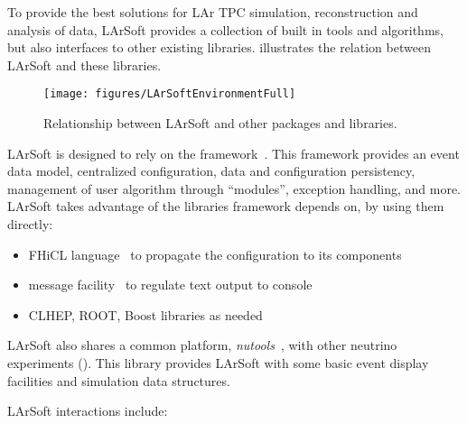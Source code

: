 
%
%
%

To provide the best solutions for LAr TPC simulation, reconstruction and
analysis of data, LArSoft provides a collection of built in tools and
algorithms, but also interfaces to other existing libraries.
 illustrates the relation between LArSoft and
these libraries.

\begin{figure}
	\texttt{[image: figures/LArSoftEnvironmentFull]}
	\caption{\label{fig:LArSoftRelations}
		Relationship between LArSoft and other packages and libraries.
	}
\end{figure}

LArSoft is designed to rely on the \ART framework~\cite{ART}.
This framework provides an event data model, centralized configuration, data
and configuration persistency, management of user algorithm through
``modules'', exception handling, and more. LArSoft takes advantage of
the libraries \ART framework depends on, by using them directly:
\begin{itemize}
\item
  FHiCL language~\cite{FHiCL} to propagate the configuration to its
  components
\item
  message facility~\cite{MessageFacility} to regulate text output to console
\item
  CLHEP, ROOT, Boost libraries as needed
\end{itemize}

LArSoft also shares a common platform, \emph{nutools}~\cite{nutools}, with
other neutrino experiments (\NOvA). This library provides LArSoft with
some basic event display facilities and simulation data structures.

LArSoft interactions include:

